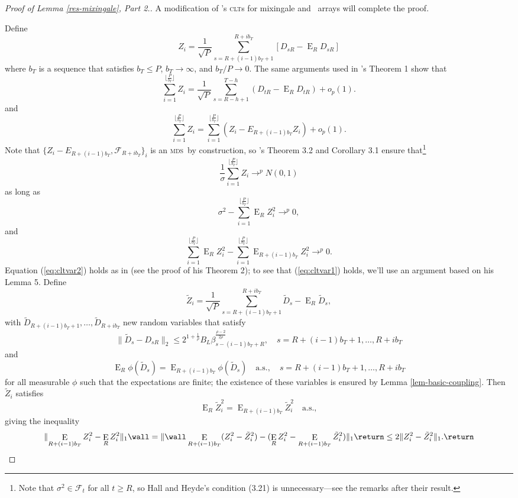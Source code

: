 \documentclass[11pt]{article}
\DeclareMathOperator{\E}{E}
\newcommand{\citepos}[1]{\citeauthor{#1}'s \citeyearpar{#1}}
\newcommand{\oosSum}[2]{\ensuremath{\sum_{#1=R-\h+#2}^{T-\h}}}
\newcommand{\h}{h}
\newcommand{\InnerBlockL}[1]{\ensuremath{R+(#1-1)b_T + 1}}
\newcommand{\InnerBlockU}[1]{\ensuremath{R+#1 b_T}}
\newcommand{\OuterBlockU}{\lfloor \frac P{b_T} \rfloor}
\newcommand{\SumOuterBlock}[1]{\ensuremath{\sum_{#1=1}^{\OuterBlockU}}}
\newcommand{\SumInnerBlock}[2]{\ensuremath{\sum_{#1=\InnerBlockL{#2}}^{\InnerBlockU{#2}}}}
\newcommand{\CEOuterBlock}[2]{\ensuremath{\E_{\InnerBlockU{(#2-1)}} #1}}
\newcommand{\ZSummand}{D_{sR} - \E_R D_{sR}}
\newcommand{\ZDef}{ \frac1{\sqrt{P}} \SumInnerBlock{s}{i} [\ZSummand]}
\newcommand{\ZSqCE}{\ensuremath{\CEOuterBlock{Z_i^2}{i}}}
\newcommand{\rhoExp}{\ensuremath{\frac{\rho-2}{2\rho}}}
\newcommand{\mds}{\textsc{mds}}
\newcommand{\clt}{\textsc{clt}}
\begin{document}
\begin{proof}[Proof of Lemma \ref{res-mixingale}, Part 2.]
  A modification of \citepos{Dej:97} \clt s for
  mixingale and \ned\ arrays will complete the proof.

Define
\[\label{eq:z1}
  Z_i = \ZDef
\]
where $b_T$ is a sequence that satisfies $b_T\leq P$,
$b_T\to\infty$, and $b_T/P\to 0$.  The same arguments used in
\citepos{Dej:97} Theorem 1 show that
\begin{equation*}
   \SumOuterBlock{i} Z_i = \frac1{\sqrt{P}} \oosSum{s}{1} (D_{tR} - \E_R D_{tR}) + o_p(1).
\end{equation*}
and
\begin{equation*}
  \SumOuterBlock{i} Z_i = \SumOuterBlock{i} (Z_i - E_{R + (i-1)b_T}
  Z_i) + o_p(1).
\end{equation*}
Note that $\{Z_i - E_{R + (i-1)b_T},\mathcal{F}_{R + i b_T}\}_i$ is an
\mds\ by construction, so \citepos{HaH:80} Theorem 3.2 and Corollary
3.1 ensure that\footnote{Note that $\sigma^2 \in \mathcal{F}_t$ for
  all $t \geq R$, so Hall and Heyde's condition (3.21) is
  unnecessary---see the remarks after their result.}
\[
\frac1{\sigma} \SumOuterBlock{i} Z_i \to^p
N(0,1)
\]
as long as
\begin{equation}\label{eq:cltvar2}
  \sigma^2 - \SumOuterBlock{i} \E_R Z_i^2 \to^p 0,
\end{equation}
and
\begin{equation}\label{eq:cltvar1}
  \SumOuterBlock{i} \E_R Z_i^2 - \SumOuterBlock{i} \ZSqCE \to^p 0.
\end{equation}
Equation (\ref{eq:cltvar2}) holds as in \citet{Dej:97} (see the proof
of his Theorem 2); to see that (\ref{eq:cltvar1}) holds, we'll use an
argument based on his Lemma 5.  Define
\[
\tilde Z_i = \frac1{\sqrt{P}} \SumInnerBlock{s}{i} \tilde D_s -
\E_R \tilde D_s,
\]
with $\tilde D_{R+(i-1)b_T + 1},\dots,\tilde D_{R+ib_T}$ new random
variables that satisfy
\[
\lVert \tilde D_s - D_{sR} \rVert_2 \leq 2^{1 + \frac1\rho} B_L \beta_{s -
  (i-1)b_T + R}^{\rhoExp}, \quad s = R+(i-1)b_T + 1,\dots,R+i b_T
\]
and
\[
\E_R \phi(\tilde D_s) = \E_{R+(i-1)b_T} \phi(\tilde D_s) \quad \text{a.s.}, \quad s = R+(i-1)b_T + 1,\dots,R+i b_T
\]
for all measurable $\phi$ such that the expectations are finite; the
existence of these variables is ensured by Lemma
\ref{lem-basic-coupling}.  Then $\tilde Z_i$ satisfies
\[
\E_R \tilde Z_i^2 = \CEOuterBlock{\tilde Z_i^2}{i} \quad \text{a.s.},
\]
giving the inequality
\[
\lVert \ZSqCE - \E_R Z_i^2 \rVert_1 \wall= \lVert \wall\CEOuterBlock{(Z_i^2 -
  \tilde Z_i^2)}{i} \\ - (\E_R Z_i^2 - \CEOuterBlock{\tilde Z_i^2}{i})
\rVert_1 \return\\
\leq 2 \lVert Z_i^2 - \tilde Z_i^2 \rVert_1.
\return
\]


\end{proof}
\end{document}
